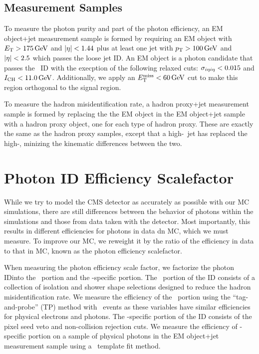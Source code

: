 \subsection{Measurement Samples}
\label{sec:measurement_samples}

To measure the photon purity and part of the photon efficiency, an EM object+jet measurement sample is formed by requiring an EM object with $E_{\mathrm{T}} > 175\,\text{Ge\hspace{-.08em}V}$ and $\lvert \eta \rvert < 1.44$ plus at least one jet with $p_{\mathrm{T}} > 100\,\text{Ge\hspace{-.08em}V}$ and $\lvert \eta \rvert < 2.5$ which passes the loose jet ID. 
An EM object is a photon candidate that passes the \egamma\ ID with the execption of the following relaxed cuts: $\sigma_{i\eta i\eta} < 0.015$ and $I_{\text{CH}} < 11.0\,\text{Ge\hspace{-.08em}V}$.
Additionally, we apply an $E_{\mathrm{T}}^{\text{miss}} < 60\,\text{Ge\hspace{-.08em}V}$ cut to make this region orthogonal to the signal region.

To measure the hadron misidentification rate, a hadron proxy+jet measurement sample is formed by replacing the the EM object in the EM object+jet sample with a hadron proxy object, one for each type of hadron proxy.
These are exactly the same as the hadron proxy samples, except that a high-\pt\ jet has replaced the high-\met, minizing the kinematic differences between the two.

\section{Photon ID Efficiency Scalefactor}
\label{sec:photoneff}

While we try to model the CMS detector as accurately as possible with our MC simulations, there are still differences between the behavior of photons within the simulations and those from data taken with the detector.
Most importantly, this results in different efficiencies for photons in data dn MC, which we must measure.
To improve our MC, we reweight it by the ratio of the efficiency in data to that in MC, known as the photon efficiency scalefactor.

When measuring the photon efficiency scale factor, we factorize the photon IDinto the \egamma\ portion and the \Pgg-specific portion. 
The \egamma\ portion of the ID consists of a collection of isolation and shower shape selections designed to reduce the hadron misidentification rate.
We measure the efficiency of the \egamma\ portion  using the ``tag-and-probe'' (TP) method with \Zee\ events as these variables have similar efficiencies for physical electrons and photons. 
The \Pgg-specific portion of the ID consists of the pixel seed veto and non-collision rejection cuts.
We measure the efficiency of \Pgg-specific portion on a sample of physical photons in the EM object+jet measurement sample using a \sieie\ template fit method.

